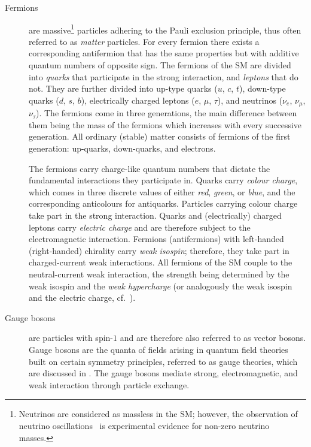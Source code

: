 \begin{description}

\item[Fermions] are massive\footnote{Neutrinos are considered as massless in the
    SM; however, the observation of neutrino
    oscillations~\cite{Super-Kamiokande:1998kpq,SNO:2002tuh} is experimental
    evidence for non-zero neutrino masses.} particles adhering to the Pauli
  exclusion principle, thus often referred to as \emph{matter} particles. For
  every fermion there exists a corresponding antifermion that has the same
  properties but with additive quantum numbers of opposite sign. The fermions of
  the SM are divided into \emph{quarks} that participate in the strong
  interaction, and \emph{leptons} that do not. They are further divided into
  up-type quarks ($u$, $c$, $t$), down-type quarks ($d$, $s$, $b$), electrically
  charged leptons ($e$, $\mu$, $\tau$), and neutrinos ($\nu_e$, $\nu_\mu$,
  $\nu_\tau$). The fermions come in three generations, the main difference
  between them being the mass of the fermions which increases with every
  successive generation. All ordinary (stable) matter consists of fermions of
  the first generation: up-quarks, down-quarks, and electrons.

  The fermions carry charge-like quantum numbers that dictate the fundamental
  interactions they participate in. Quarks carry \emph{colour charge}, which
  comes in three discrete values of either \emph{red}, \emph{green}, or
  \emph{blue}, and the corresponding anticolours for antiquarks. Particles
  carrying colour charge take part in the strong interaction. Quarks and
  (electrically) charged leptons carry \emph{electric charge} and are therefore
  subject to the electromagnetic interaction. Fermions (antifermions) with
  left-handed (right-handed) chirality carry \emph{weak isospin}; therefore, they
  take part in charged-current weak interactions. All fermions of the SM
  couple to the neutral-current weak interaction, the strength being determined
  by the weak isospin and the \emph{weak hypercharge} (or analogously the weak
  isospin and the electric charge, cf.~).

\item[Gauge bosons] are particles with spin-$1$ and are therefore also referred
  to as vector bosons. Gauge bosons are the quanta of fields arising in quantum
  field theories built on certain symmetry principles, referred to as gauge
  theories, which are discussed in . The
  gauge bosons mediate strong, electromagnetic, and weak interaction through
  particle exchange.


\end{description}
